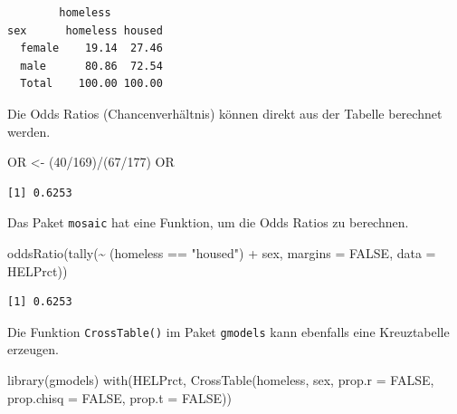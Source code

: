 \documentclass[
  ngerman,
]{scrbook}
\newenvironment{Shaded}{\begin{snugshade}}{\end{snugshade}}
\newcommand{\AttributeTok}[1]{\textcolor[rgb]{0.77,0.63,0.00}{#1}}
\newcommand{\ConstantTok}[1]{\textcolor[rgb]{0.00,0.00,0.00}{#1}}
\newcommand{\DecValTok}[1]{\textcolor[rgb]{0.00,0.00,0.81}{#1}}
\newcommand{\FunctionTok}[1]{\textcolor[rgb]{0.00,0.00,0.00}{#1}}
\newcommand{\NormalTok}[1]{#1}
\newcommand{\OtherTok}[1]{\textcolor[rgb]{0.56,0.35,0.01}{#1}}
\newcommand{\SpecialCharTok}[1]{\textcolor[rgb]{0.00,0.00,0.00}{#1}}
\newcommand{\StringTok}[1]{\textcolor[rgb]{0.31,0.60,0.02}{#1}}
\begin{document}
\begin{verbatim}
        homeless
sex      homeless housed
  female    19.14  27.46
  male      80.86  72.54
  Total    100.00 100.00
\end{verbatim}

Die Odds Ratios (Chancenverhältnis) können direkt aus der Tabelle berechnet werden.

\begin{Shaded}
\begin{Highlighting}[]
\NormalTok{OR }\OtherTok{\textless{}{-}}\NormalTok{ (}\DecValTok{40}\SpecialCharTok{/}\DecValTok{169}\NormalTok{)}\SpecialCharTok{/}\NormalTok{(}\DecValTok{67}\SpecialCharTok{/}\DecValTok{177}\NormalTok{)}
\NormalTok{OR}
\end{Highlighting}
\end{Shaded}

\begin{verbatim}
[1] 0.6253
\end{verbatim}

Das Paket \texttt{mosaic} hat eine Funktion, um die Odds Ratios zu berechnen.

\begin{Shaded}
\begin{Highlighting}[]
\FunctionTok{oddsRatio}\NormalTok{(}\FunctionTok{tally}\NormalTok{(}\SpecialCharTok{\textasciitilde{}}\NormalTok{ (homeless }\SpecialCharTok{==} \StringTok{"housed"}\NormalTok{) }\SpecialCharTok{+}\NormalTok{ sex,}
                   \AttributeTok{margins =} \ConstantTok{FALSE}\NormalTok{, }\AttributeTok{data =}\NormalTok{ HELPrct))}
\end{Highlighting}
\end{Shaded}

\begin{verbatim}
[1] 0.6253
\end{verbatim}

Die Funktion \texttt{CrossTable()} im Paket \texttt{gmodels} kann ebenfalls eine Kreuztabelle erzeugen.

\begin{Shaded}
\begin{Highlighting}[]
\FunctionTok{library}\NormalTok{(gmodels)}
\FunctionTok{with}\NormalTok{(HELPrct, }\FunctionTok{CrossTable}\NormalTok{(homeless, sex, }
                         \AttributeTok{prop.r =} \ConstantTok{FALSE}\NormalTok{, }
                         \AttributeTok{prop.chisq =} \ConstantTok{FALSE}\NormalTok{, }
                         \AttributeTok{prop.t =} \ConstantTok{FALSE}\NormalTok{))}
\end{Highlighting}
\end{Shaded}
\end{document}
